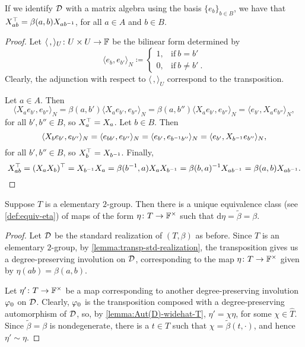 \begin{lemma}\label{lemma:transp-std-realization}
    If we identify $\mathcal{D}$ with a matrix algebra using the basis $\{ e_b \}_{b\in B}$, we have that $X_{ab}^{\top} = \beta(a,b) X_{ab^{-1}}$, for all $a\in A$ and $b\in B$. 
\end{lemma}

\begin{proof}
    Let $\langle \, , \rangle_U \colon U\times U \to \mathbb{F}$ be the bilinear form determined by
    \[
        \langle e_b , e_{b'} \rangle_N \coloneqq \begin{cases}
            1, & \text{if}\ b=b' \\
            0, & \text{if}\ b\neq b'\ .
        \end{cases}
    \]
    Clearly, the adjunction with respect to $\langle \, , \rangle_U$ correspond to the transposition. 
    
    Let $a \in A$. 
    Then
    \[
        \langle X_a e_{b'}, e_{b''} \rangle_N = \beta(a, b') \langle X_a e_{b'}, e_{b''} \rangle_N = \beta(a, b'') \langle X_a e_{b'} , e_{b''} \rangle_N = \langle e_{b'}, X_a e_{b''} \rangle_N,
    \]
    for all $b',b'' \in B$, so $X_a^{\top} = X_a$. 
    Let $b \in B$. 
    Then
    \[
        \langle X_b e_{b'}, e_{b''} \rangle_N = \langle e_{bb'}, e_{b''} \rangle_N = \langle e_{b'}, e_{b^{-1} b''} \rangle_N = \langle e_{b'}, X_{b^{-1}} e_{b''} \rangle_N,
    \]
    for all $b',b'' \in B$, so $X_b^{\top} = X_{b^{-1}}$. 
    Finally, 
    \[
        X_{ab}^{\top} = (X_a X_b)^{\top} = X_{b^{-1}}X_a = \beta(b^{-1}, a) X_a X_{b^{-1}} = \beta(b,a)^{-1} X_{ab^{-1}} = \beta(a,b) X_{ab^{-1}}.
    \]
\end{proof}

\begin{prop}\label{prop:osp-p-unique-eta}
    Suppose $T$ is a elementary $2$-group. 
    Then there is a unique equivalence class (see \cref{def:equiv-eta}) of maps of the form $\eta\colon T \to \mathbb{F}^\times$ such that $\mathrm{d}\eta = \tilde\beta = \beta$.
\end{prop}

\begin{proof}
    Let $\mathcal{D}$ be the standard realization of $(T, \beta)$ as before. 
    Since $T$ is an elementary $2$-group, by \cref{lemma:transp-std-realization}, the transposition gives us a degree-preserving involution on $\mathcal{D}$, corresponding to the map $\eta\colon T \to \mathbb{F}^\times$ given by $\eta(ab) = \beta(a,b)$. 

    Let $\eta'\colon T \to \mathbb{F}^\times$ be a map corresponding to another degree-preserving involution $\varphi_0$ on $\mathcal{D}$. 
    Clearly, $\varphi_0$ is the transposition composed with a degree-preserving automorphism of $\mathcal{D}$, so, by \cref{lemma:Aut(D)-widehat-T}, $\eta' = \chi \eta$, for some $\chi \in \widehat{T}$. 
    Since $\tilde\beta = \beta$ is nondegenerate, there is a $t\in T$ such that $\chi = \tilde\beta(t, \cdot)$, and hence $\eta' \sim \eta$.
\end{proof}

